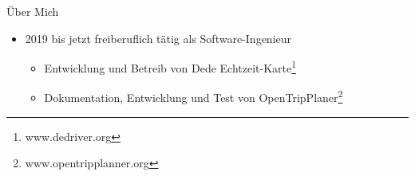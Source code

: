 
\begin{frame}{Über Mich}
  \begin{itemize}
  \item 2019 bis jetzt freiberuflich tätig als Software-Ingenieur
    \begin{itemize}
    \item Entwicklung und Betreib von Dede Echtzeit-Karte\footnote{www.dedriver.org}
    \item Dokumentation, Entwicklung und Test von OpenTripPlaner\footnote{www.opentripplanner.org}
    \end{itemize}
  \end{itemize}
\end{frame}

